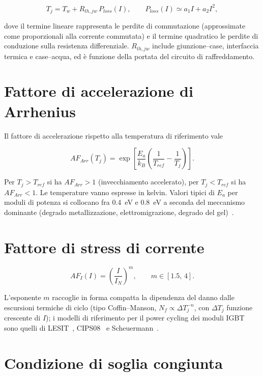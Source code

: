 \documentclass[11pt,a4paper]{article}
\begin{document}
\begin{equation}
  T_j = T_w + R_{th,jw}\,P_{loss}(I),
  \qquad
  P_{loss}(I) \simeq a_1 I + a_2 I^2 ,
  \label{eq:termico}
\end{equation}

dove il termine lineare rappresenta le perdite di commutazione (approssimate
come proporzionali alla corrente commutata) e il termine quadratico le perdite
di conduzione sulla resistenza differenziale. $R_{th,jw}$ include giunzione--case,
interfaccia termica e case--acqua, ed è funzione della portata del circuito di
raffreddamento.

\section{Fattore di accelerazione di Arrhenius}

Il fattore di accelerazione rispetto alla temperatura di riferimento vale

\begin{equation}
  AF_{Arr}(T_j) = \exp\!\left[\frac{E_a}{k_B}
  \left(\frac{1}{T_{ref}} - \frac{1}{T_j}\right)\right].
  \label{eq:arrhenius}
\end{equation}

Per $T_j > T_{ref}$ si ha $AF_{Arr} > 1$ (invecchiamento accelerato), per
$T_j < T_{ref}$ si ha $AF_{Arr} < 1$. Le temperature vanno espresse in kelvin.
Valori tipici di $E_a$ per moduli di potenza si collocano fra
\SI{0.4}{\electronvolt} e \SI{0.8}{\electronvolt} a seconda del meccanismo
dominante (degrado metallizzazione, elettromigrazione, degrado del
gel)~\cite{ciappa2002,jep122}.

\section{Fattore di stress di corrente}

\begin{equation}
  AF_I(I) = \left(\frac{I}{I_N}\right)^{m},
  \qquad m \in [1.5,\,4].
  \label{eq:corrente}
\end{equation}

L'esponente $m$ raccoglie in forma compatta la dipendenza del danno dalle
escursioni termiche di ciclo (tipo Coffin--Manson, $N_f \propto \Delta T_j^{-n}$,
con $\Delta T_j$ funzione crescente di $I$); i modelli di riferimento per il
power cycling dei moduli IGBT sono quelli di
LESIT~\cite{held1997}, CIPS08~\cite{bayerer2008} e
Scheuermann~\cite{scheuermann2013}.

\section{Condizione di soglia congiunta}
\end{document}
